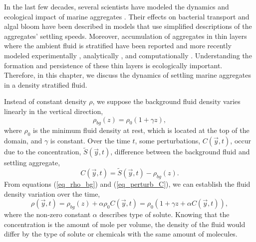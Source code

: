 

In the last few decades, several scientists have modeled the dynamics and ecological impact of  marine aggregates \cite{jackson_aggregation_1998, kiorboe_mechanisms_2002}. 
Their effects on bacterial transport \cite{jackson_simulation_1989} and algal bloom \cite{jackson_model_1990} have been described in models that use simplified descriptions of the aggregates' settling speeds. Moreover, accumulation of aggregates in thin layers where the ambient fluid is stratified have been reported \cite{macintyre_accumulation_1995, alldredge_occurrence_2002} and more recently modeled experimentally \cite{prairie_delayed_2013}, analytically \cite{camassa_retention_2013}, and computationally \cite{panah_simulations_2017}. Understanding the formation and persistence of these thin layers is ecologically important. 
Therefore, in this chapter, we discuss the dynamics of settling marine aggregates in a density stratified fluid. 
\par
Instead of constant density $\rho$, we suppose the background fluid density varies linearly in the vertical direction,
\begin{equation}
\rho_{bg}(z) =  \rho_0 \left(1 + \gamma z \right),
\label{eq_rho_bg}
\end{equation}
where $\rho_0$ is the minimum fluid density at rest, which is located at the top of the domain, and $\gamma$ is constant.
Over the time $t$, some perturbations, $C(\vec{y},t)$, occur due to the concentration, $\tilde{S}(\vec{y},t)$, difference between the background fluid and settling aggregate,
\begin{equation}
C(\vec{y}, t) =  \tilde{S}(\vec{y},t) - \rho_{bg}(z).
\label{eq_perturb_C}
\end{equation}
From equations (\ref{eq_rho_bg}) and (\ref{eq_perturb_C}), we can establish the fluid density variation over the time,
\begin{equation}
	\rho(\vec{y},t ) 
	= \rho_{bg}(z) +  \alpha \rho_0 C(\vec{y},t) 
	 = \rho_0 \left( 1 + \gamma z  + \alpha  C(\vec{y},t) \right),
\label{eq_density}
\end{equation}
where the non-zero constant $\alpha $ describes type of solute. Knowing that the concentration is the amount of mole per volume, the density of the fluid would differ by the type of solute or chemicals with the same amount of molecules.
